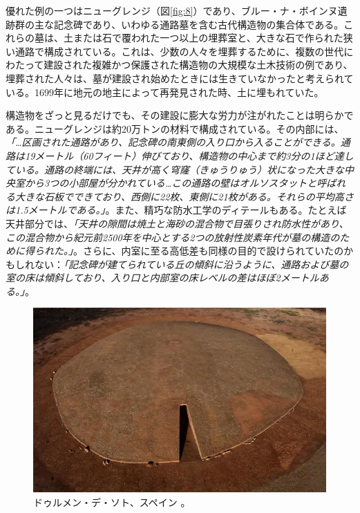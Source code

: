 \documentclass[10pt,twocolumn,letterpaper]{article}
\begin{document}
優れた例の一つはニューグレンジ（図\ref{fig:8}）であり、ブルー・ナ・ボインヌ遺跡群の主な記念碑であり、いわゆる通路墓を含む古代構造物の集合体である。これらの墓は、土または石で覆われた一つ以上の埋葬室と、大きな石で作られた狭い通路で構成されている\cite{70}。これは、少数の人々を埋葬するために、複数の世代にわたって建設された複雑かつ保護された構造物の大規模な土木技術の例であり、埋葬された人々は、墓が建設され始めたときには生きていなかったと考えられている。1699年に地元の地主によって再発見された時、土に埋もれていた。

構造物をざっと見るだけでも、その建設に膨大な労力が注がれたことは明らかである。ニューグレンジは約20万トンの材料で構成されている。その内部には、\textit{「…区画された通路があり、記念碑の南東側の入り口から入ることができる。通路は19メートル（60フィート）伸びており、構造物の中心まで約3分の1ほど達している。通路の終端には、天井が高く穹窿（きゅうりゅう）状になった大きな中央室から3つの小部屋が分かれている…この通路の壁はオルソスタットと呼ばれる大きな石板でできており、西側に22枚、東側に21枚がある。それらの平均高さは1.5メートルである。」}\cite{70}。また、精巧な防水工学のディテールもある。たとえば天井部分では、\textit{「天井の隙間は焼土と海砂の混合物で目張りされ防水性があり、この混合物から紀元前2500年を中心とする2つの放射性炭素年代が墓の構造のために得られた。」}\cite{71}。さらに、内室に至る高低差も同様の目的で設けられていたのかもしれない：\textit{「記念碑が建てられている丘の傾斜に沿うように、通路および墓の室の床は傾斜しており、入り口と内部室の床レベルの差はほぼ2メートルある。」}\cite{71}。

\begin{figure}[b]
\begin{center}
   \includegraphics[width=1\linewidth]{dolmen.jpg}
\end{center}
   \caption{ドゥルメン・デ・ソト、スペイン \cite{53}。}
\label{fig:9}
\label{fig:onecol}
\end{figure}
\end{document}

